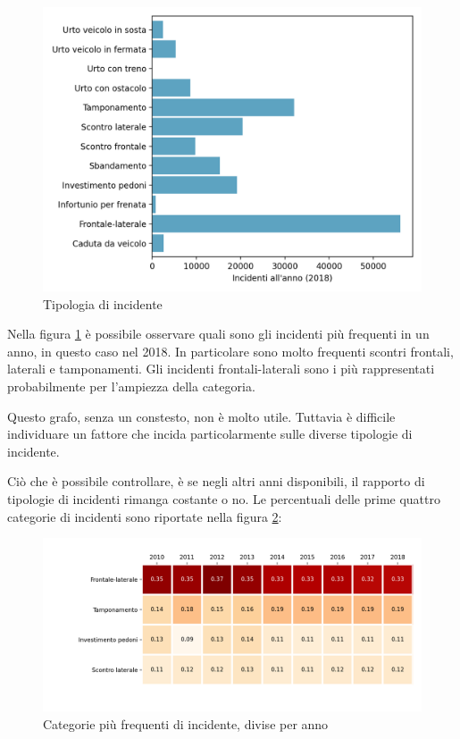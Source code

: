 \documentclass[a4paper]{report}
\begin{document}
\begin{figure}
    \includegraphics[width=\linewidth]{../src/incidenti/incidenti_senza_coords/localizzazione_incidente/tipo_incidente.png}
    \caption{Tipologia di incidente}
    \label{fig:tipo-incidente}
\end{figure}

Nella figura \ref{fig:tipo-incidente} è possibile osservare quali sono gli incidenti 
più frequenti in un anno, in questo caso nel 2018.
In particolare sono molto frequenti scontri frontali, laterali e tamponamenti. 
Gli incidenti frontali-laterali sono i più rappresentati probabilmente per 
l'ampiezza della categoria.

Questo grafo, senza un constesto, non è molto utile. Tuttavia è difficile 
individuare un fattore che incida particolarmente sulle diverse tipologie di incidente.

Ciò che è possibile controllare, è se negli altri anni disponibili, il rapporto 
di tipologie di incidenti rimanga costante o no.
Le percentuali delle prime quattro categorie di incidenti sono riportate nella 
figura \ref{fig:rapporto-tipologie}: 

\begin{figure}
    \includegraphics[width=\linewidth]{../src/incidenti/incidenti_senza_coords/localizzazione_incidente/rapporto_tipologie.png}
    \caption{Categorie più frequenti di incidente, divise per anno}
    \label{fig:rapporto-tipologie}
\end{figure}
\end{document}
